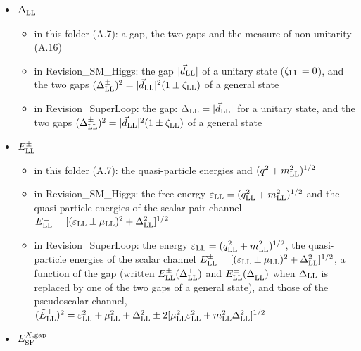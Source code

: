 \documentclass[
  10pt,
]{article}
\providecommand{\tightlist}{%
  \setlength{\itemsep}{0pt}\setlength{\parskip}{0pt}}
\begin{document}
\begin{itemize}
  \begin{itemize}
  \tightlist
  \item
    in this folder (A.7): a gap, the two gaps and the measure of
    non-unitarity (A.16)
  \item
    in Revision\_SM\_Higgs: the gap \(\lvert\vec d_{\rm LL}\rvert\) of a
    unitary state (\(\zeta_{\rm LL}=0\)), and the two gaps
    \((\Delta^\pm_{\rm LL})^2=\lvert\vec d_{\rm LL}\rvert^2(1\pm\zeta_{\rm LL})\)
    of a general state
  \item
    in Revision\_SuperLoop: the gap:
    \(\Delta_{\rm LL}=\lvert\vec d_{\rm LL}\rvert\) for a unitary state,
    and the two gaps
    \((\Delta^\pm_{\rm LL})^2=\lvert\vec d_{\rm LL}\rvert^2(1\pm\zeta_{\rm LL})\)
    of a general state
  \end{itemize}
\item
  \(\Delta_{\rm LL}\)

  \begin{itemize}
  \tightlist
  \item
    in this folder (A.7): a gap, the two gaps and the measure of
    non-unitarity (A.16)
  \item
    in Revision\_SM\_Higgs: the gap \(\lvert\vec d_{\rm LL}\rvert\) of a
    unitary state (\(\zeta_{\rm LL}=0\)), and the two gaps
    \((\Delta^\pm_{\rm LL})^2=\lvert\vec d_{\rm LL}\rvert^2(1\pm\zeta_{\rm LL})\)
    of a general state
  \item
    in Revision\_SuperLoop: the gap:
    \(\Delta_{\rm LL}=\lvert\vec d_{\rm LL}\rvert\) for a unitary state,
    and the two gaps
    \((\Delta^\pm_{\rm LL})^2=\lvert\vec d_{\rm LL}\rvert^2(1\pm\zeta_{\rm LL})\)
    of a general state
  \end{itemize}
\item
  \(E^\pm_{\rm LL}\)

  \begin{itemize}
  \tightlist
  \item
    in this folder (A.7): the quasi-particle energies and
    \((q^2+m_{\rm LL}^2)^{1/2}\)
  \item
    in Revision\_SM\_Higgs: the free energy
    \(\varepsilon_{\rm LL}=(q_{\rm LL}^2+m_{\rm LL}^2)^{1/2}\) and the
    quasi-particle energies of the scalar pair channel
    \(E^\pm_{\rm LL}=[(\varepsilon_{\rm LL}\pm\mu_{\rm LL})^2+\Delta_{\rm LL}^2]^{1/2}\)
  \item
    in Revision\_SuperLoop: the energy
    \(\varepsilon_{\rm LL}=(q_{\rm LL}^2+m_{\rm LL}^2)^{1/2}\), the
    quasi-particle energies of the scalar channel
    \(E^\pm_{\rm LL}=[(\varepsilon_{\rm LL}\pm\mu_{\rm LL})^2+\Delta_{\rm LL}^2]^{1/2}\),
    a function of the gap (written \(E^\pm_{\rm LL}(\Delta^+_{\rm LL})\)
    and \(E^\pm_{\rm LL}(\Delta^-_{\rm LL})\) when \(\Delta_{\rm LL}\)
    is replaced by one of the two gaps of a general state), and those of
    the pseudoscalar channel,
    \((\tilde E^\pm_{\rm LL})^2=\varepsilon_{\rm LL}^2+\mu_{\rm LL}^2+\Delta_{\rm LL}^2\pm2[\mu_{\rm LL}^2\varepsilon_{\rm LL}^2+m_{\rm LL}^2\Delta_{\rm LL}^2]^{1/2}\)
  \end{itemize}
\item
  \(E^{X,{\rm gap}}_{\rm SF}\)


\end{itemize}
\end{document}
